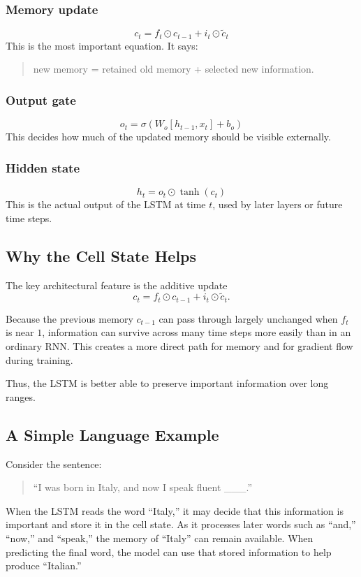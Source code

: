 \subsubsection*{Memory update}
\[
c_t = f_t \odot c_{t-1} + i_t \odot \tilde{c}_t
\]
This is the most important equation. It says:
\begin{quote}
new memory = retained old memory + selected new information.
\end{quote}

\subsubsection*{Output gate}
\[
o_t = \sigma(W_o [h_{t-1},x_t] + b_o)
\]
This decides how much of the updated memory should be visible externally.

\subsubsection*{Hidden state}
\[
h_t = o_t \odot \tanh(c_t)
\]
This is the actual output of the LSTM at time \(t\), used by later layers or future time steps.

\subsection{Why the Cell State Helps}

The key architectural feature is the additive update
\[
c_t = f_t \odot c_{t-1} + i_t \odot \tilde{c}_t.
\]

Because the previous memory \(c_{t-1}\) can pass through largely unchanged when \(f_t\) is near \(1\), information can survive across many time steps more easily than in an ordinary RNN. This creates a more direct path for memory and for gradient flow during training.

Thus, the LSTM is better able to preserve important information over long ranges.

\subsection{A Simple Language Example}

Consider the sentence:
\begin{quote}
``I was born in Italy, and now I speak fluent \_\_\_.''
\end{quote}

When the LSTM reads the word ``Italy,'' it may decide that this information is important and store it in the cell state. As it processes later words such as ``and,'' ``now,'' and ``speak,'' the memory of ``Italy'' can remain available. When predicting the final word, the model can use that stored information to help produce ``Italian.''


